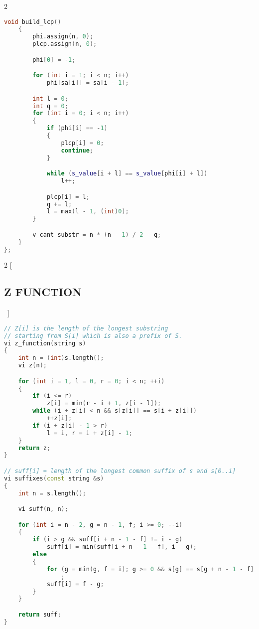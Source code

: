 \documentclass[leter]{amsart}
\begin{document}
\begin{multicols}{2}
\begin{lstlisting}[language=C++]
    void build_lcp()
    {
        phi.assign(n, 0);
        plcp.assign(n, 0);

        phi[0] = -1;

        for (int i = 1; i < n; i++)
            phi[sa[i]] = sa[i - 1];

        int l = 0;
        int q = 0;
        for (int i = 0; i < n; i++)
        {
            if (phi[i] == -1)
            {
                plcp[i] = 0;
                continue;
            }

            while (s_value[i + l] == s_value[phi[i] + l])
                l++;

            plcp[i] = l;
            q += l;
            l = max(l - 1, (int)0);
        }

        v_cant_substr = n * (n - 1) / 2 - q;
    }
};

\end{lstlisting}
\end{multicols}
\begin{multicols}{2}
[\subsection{Z FUNCTION}\ ]
\begin{lstlisting}[language=C++]
// Z[i] is the length of the longest substring
// starting from S[i] which is also a prefix of S.
vi z_function(string s)
{
    int n = (int)s.length();
    vi z(n);

    for (int i = 1, l = 0, r = 0; i < n; ++i)
    {
        if (i <= r)
            z[i] = min(r - i + 1, z[i - l]);
        while (i + z[i] < n && s[z[i]] == s[i + z[i]])
            ++z[i];
        if (i + z[i] - 1 > r)
            l = i, r = i + z[i] - 1;
    }
    return z;
}

// suff[i] = length of the longest common suffix of s and s[0..i]
vi suffixes(const string &s)
{
    int n = s.length();

    vi suff(n, n);

    for (int i = n - 2, g = n - 1, f; i >= 0; --i)
    {
        if (i > g && suff[i + n - 1 - f] != i - g)
            suff[i] = min(suff[i + n - 1 - f], i - g);
        else
        {
            for (g = min(g, f = i); g >= 0 && s[g] == s[g + n - 1 - f]; --g)
                ;
            suff[i] = f - g;
        }
    }

    return suff;
}

\end{lstlisting}
\end{multicols}
\end{document}
